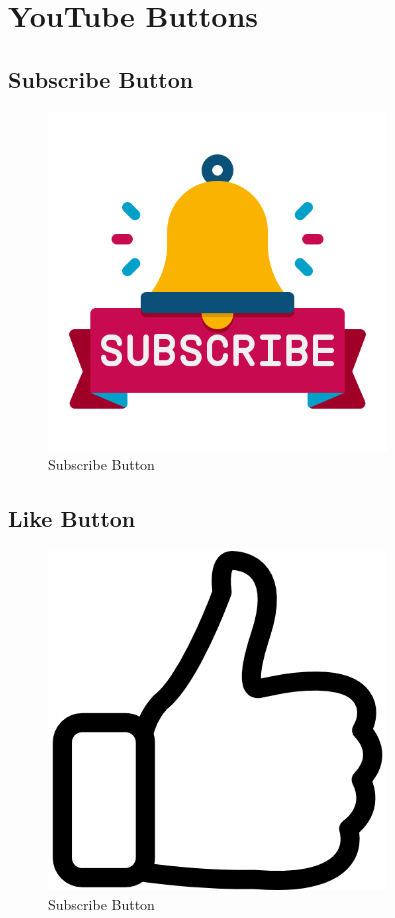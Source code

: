 \chapter{YouTube Buttons}

\section{Subscribe Button}
\begin{figure}[ht]
    \centering
    \includegraphics[width=0.8\textwidth]{images/subscribe.png}
    \caption{Subscribe Button}
    \label{fig:Subscribe}
\end{figure}


\section{Like Button}
\begin{figure}[ht]
    \centering
    \includegraphics[width=0.8\textwidth]{images/like.png}
    \caption{Subscribe Button}
    \label{fig:Like}
\end{figure}


